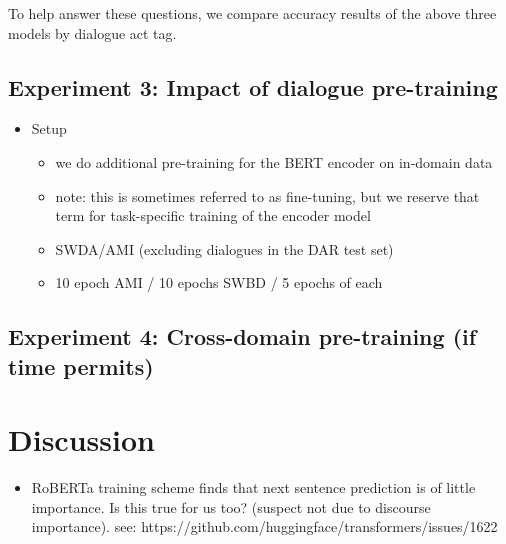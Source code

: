 \documentclass[11pt,a4paper]{article}
\begin{document}
To help answer these questions, we compare accuracy results of the above three models by dialogue act tag.


\subsection{Experiment 3: Impact of dialogue pre-training} %
\begin{itemize}
  \item Setup
    \begin{itemize}
      \item we do additional pre-training for the BERT encoder on in-domain data
      \item note: this is sometimes referred to as fine-tuning, but we reserve that term for task-specific training of the encoder model

      \item SWDA/AMI (excluding dialogues in the DAR test set)
      \item 10 epoch AMI / 10 epochs SWBD / 5 epochs of each
    \end{itemize}
\end{itemize}

\subsection{Experiment 4: Cross-domain pre-training (if time permits)} %

\section{Discussion} %
\begin{itemize}
  \item RoBERTa training scheme finds that next sentence prediction is of little importance. Is this true for us too? (suspect not due to discourse importance). see: https://github.com/huggingface/transformers/issues/1622
\end{itemize}



\end{document}
